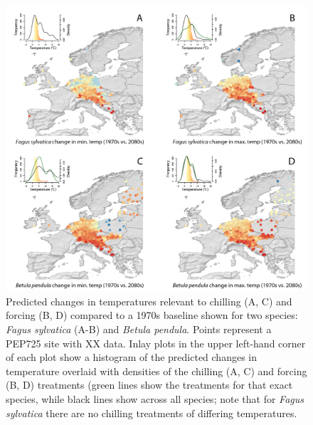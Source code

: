 \documentclass[11pt,letter]{article}
\begin{document}
\newpage
\begin{figure}[t!]
\centering
\includegraphics[width=1\textwidth]{figures/Fig1_noblues_densities.png}
\caption{Predicted changes in temperatures relevant to chilling (A, C) and forcing (B, D) compared to a 1970s baseline shown for two species: \emph{Fagus sylvatica} (A-B) and \emph{Betula pendula}. Points represent a PEP725 site with XX data. Inlay plots in the upper left-hand corner of each plot show a histogram of the predicted changes in temperature overlaid with densities of the chilling (A, C) and forcing (B, D) treatments (green lines show the treatments for that exact species, while black lines show across all species; note that for \emph{Fagus sylvatica} there are no chilling treatments of differing temperatures.}
  \label{fig:pep}
\end{figure}
\clearpage
\end{document}
